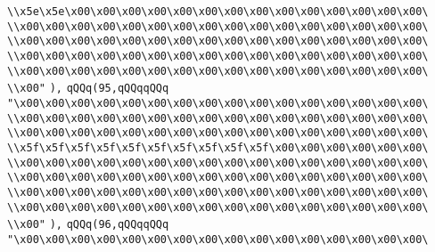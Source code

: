 \verb|\\x5e\x5e\x00\x00\x00\x00\x00\x00\x00\x00\x00\x00\x00\x00\x00\x00\|\newline
\verb|\\x00\x00\x00\x00\x00\x00\x00\x00\x00\x00\x00\x00\x00\x00\x00\x00\|\newline
\verb|\\x00\x00\x00\x00\x00\x00\x00\x00\x00\x00\x00\x00\x00\x00\x00\x00\|\newline
\verb|\\x00\x00\x00\x00\x00\x00\x00\x00\x00\x00\x00\x00\x00\x00\x00\x00\|\newline
\verb|\\x00\x00\x00\x00\x00\x00\x00\x00\x00\x00\x00\x00\x00\x00\x00\x00\|\newline
\verb|\\x00"|\newline
\verb|),|\newline
\verb|qQQq(95,qQQqqQQq|\newline
\verb|"\x00\x00\x00\x00\x00\x00\x00\x00\x00\x00\x00\x00\x00\x00\x00\x00\|\newline
\verb|\\x00\x00\x00\x00\x00\x00\x00\x00\x00\x00\x00\x00\x00\x00\x00\x00\|\newline
\verb|\\x00\x00\x00\x00\x00\x00\x00\x00\x00\x00\x00\x00\x00\x00\x00\x00\|\newline
\verb|\\x5f\x5f\x5f\x5f\x5f\x5f\x5f\x5f\x5f\x5f\x00\x00\x00\x00\x00\x00\|\newline
\verb|\\x00\x00\x00\x00\x00\x00\x00\x00\x00\x00\x00\x00\x00\x00\x00\x00\|\newline
\verb|\\x00\x00\x00\x00\x00\x00\x00\x00\x00\x00\x00\x00\x00\x00\x00\x00\|\newline
\verb|\\x00\x00\x00\x00\x00\x00\x00\x00\x00\x00\x00\x00\x00\x00\x00\x00\|\newline
\verb|\\x00\x00\x00\x00\x00\x00\x00\x00\x00\x00\x00\x00\x00\x00\x00\x00\|\newline
\verb|\\x00"|\newline
\verb|),|\newline
\verb|qQQq(96,qQQqqQQq|\newline
\verb|"\x00\x00\x00\x00\x00\x00\x00\x00\x00\x00\x00\x00\x00\x00\x00\x00\|\newline
